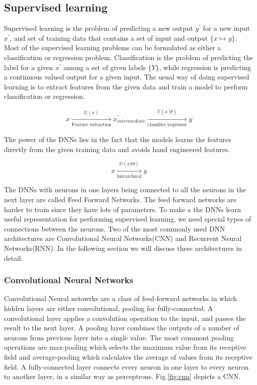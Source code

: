 \documentclass[a4paper]{article}
\begin{document}
\subsection{Supervised  learning}

Supervised  learning is the problem of predicting a new  output $y^\prime$ for a
new input $x^\prime$, and set of  training data that contains a set of input and
output  $\{x  \mapsto y\}$.  Most  of the supervised  learning problems  can  be
formulated as either a classification or  regression  problem. Classification is
the problem of predicting the label for a given $x^\prime$  among a set of given
labels $\{Y\}$, while  regression is predicting a continuous valued output for a
given input. The usual way of doing  supervised learning is to extract  features
from the given data and train a model to perform classification or regression.


\begin{equation*}
  x
  \xrightarrow[\text{Feature extraction}]{
    \mathbb{D}(x)
  }
  x^\prime
  _{intermediate}
  \xrightarrow[\text{classifier/regressor}]{
    \mathbb{F}(x^\prime | \theta)
  }
  y
\end{equation*}


The  power of  the DNNs  lies in  the  fact that  the models learns the features
directly from the given training data and avoids hand engineered features.


\begin{equation*}
  x \xrightarrow[ \text{hierarchical}] { \mathbb{M}(x | \Theta) } y
\end{equation*}


The DNNs  with neurons in one  layers being connected to all the neurons  in the
next  layer  are  called  Feed Forward Networks. The feed  forward networks  are
harder  to train since  they have lots  of parameters. To make  a the DNNs learn
useful representation for performing supervised learning,  we need special types
of  connections  between  the  neurons.  Two  of  the  most  commonly  used  DNN
architectures  are  Convolutional  Neural  Networks(CNN)  and  Recurrent  Neural
Networks(RNN). In the following section  we  will discuss these architectures in
detail.


\subsubsection{Convolutional Neural Networks}

Convolutional Neural netowrks  are  a class  of  feed-forward  networks in which
hidden  layers  are   either  convolutional,   pooling  for  fully-connected.  A
convolutional layer applies a convolution operation to the input, and passes the
result to  the next  layer. A pooling layer combines the outputs of  a number of
neurons from  previous  layer  into  a single value.  The  most commont  pooling
operations are  max-pooling which selects the  maximum value from its  receptive
field  and  average-pooling which  calculates the  average  of values  from  its
receptive field.  A fully-connected layer  connects every neuron in one layer to
every   neuron  to  another   layer,   in   a  similar   way   as   perceptrons.
Fig.\ref{fig:cnn} depicts a CNN.
\end{document}
